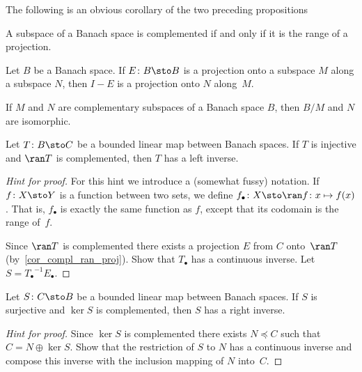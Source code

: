 The following is an obvious corollary of the two preceding propositions

\begin{cor}\label{cor_compl_ran_proj} A subspace of a Banach space is complemented if and only if it is
the range of a projection.
\end{cor}

\begin{prop} Let $B$ be a Banach space.  If $E \colon B \sto B$ is a projection onto a subspace
$M$ along a subspace $N$, then $I - E$ is a projection onto $N$ along~$M$.
\end{prop}

\begin{prop}\label{C069824} If $M$ and $N$ are complementary subspaces of a Banach space $B$, then $B/M$ and
$N$ are isomorphic.
\end{prop}

\begin{prop}\label{prop_linv_Bsp} Let $T \colon B \sto C$ be a bounded linear map between Banach spaces.
If $T$ is injective and $\ran T$ is complemented, then $T$ has a left inverse.
\end{prop}

\begin{proof}[\emph{Hint for proof}] For this hint we introduce a (somewhat fussy) notation.
If $f\colon X \sto Y$ is a function between two sets, we define
$f_\bullet \colon X \sto \ran f\colon x \mapsto f(x)$.  That is, $f_\bullet$ is exactly the same
function as $f$, except that its codomain is the range of~$f$.

Since $\ran T$ is complemented there exists a projection $E$ from $C$ onto~$\ran T$
(by~\ref{cor_compl_ran_proj}).  Show that $T_\bullet$ has a continuous inverse.
Let $S = {T_\bullet}^{-1}E_\bullet$.    \ns
\end{proof}

\begin{prop}\label{prop_rinv_Bsp} Let $S \colon C \sto B$ be a bounded linear map between Banach spaces.
If $S$ is surjective and $\ker S$ is complemented, then $S$ has a right inverse.
\end{prop}

\begin{proof}[\emph{Hint for proof}] Since $\ker S$ is complemented there exists $N \preceq C$ such that
$C = N \oplus \ker S$. Show that the restriction of $S$ to $N$ has a continuous inverse and compose this
inverse with the inclusion mapping of $N$ into~$C$.   \ns
\end{proof}

